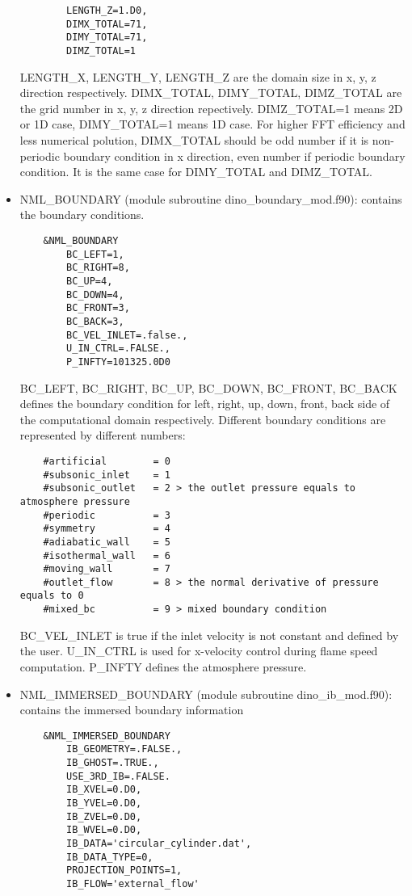\begin{itemize}
\begin{lstlisting}
        LENGTH_Z=1.D0,
        DIMX_TOTAL=71,
        DIMY_TOTAL=71,
        DIMZ_TOTAL=1
  \end{lstlisting}
  LENGTH\_X, LENGTH\_Y, LENGTH\_Z are the domain size in x, y, z direction respectively. DIMX\_TOTAL, DIMY\_TOTAL, DIMZ\_TOTAL are the grid number in x, y, z direction repectively. DIMZ\_TOTAL=1 means 2D or 1D case, DIMY\_TOTAL=1 means 1D case. For higher FFT efficiency and less numerical polution, DIMX\_TOTAL should be odd number if it is non-periodic boundary condition in x direction, even number if periodic boundary condition. It is the same case for DIMY\_TOTAL and DIMZ\_TOTAL.
  \item NML\_BOUNDARY (module subroutine dino\_boundary\_mod.f90): contains the boundary conditions.
  \begin{lstlisting}
    &NML_BOUNDARY
        BC_LEFT=1,
        BC_RIGHT=8,
        BC_UP=4,
        BC_DOWN=4,
        BC_FRONT=3,
        BC_BACK=3,
        BC_VEL_INLET=.false.,
        U_IN_CTRL=.FALSE.,
        P_INFTY=101325.0D0
  \end{lstlisting}
  BC\_LEFT, BC\_RIGHT, BC\_UP, BC\_DOWN, BC\_FRONT, BC\_BACK defines the boundary condition for left, right, up, down, front, back side of the computational domain respectively.
  Different boundary conditions are represented by different numbers:
  \begin{lstlisting}
    #artificial        = 0
    #subsonic_inlet    = 1
    #subsonic_outlet   = 2 > the outlet pressure equals to atmosphere pressure
    #periodic          = 3
    #symmetry          = 4
    #adiabatic_wall    = 5
    #isothermal_wall   = 6
    #moving_wall       = 7
    #outlet_flow       = 8 > the normal derivative of pressure equals to 0
    #mixed_bc          = 9 > mixed boundary condition
  \end{lstlisting}
  BC\_VEL\_INLET is true if the inlet velocity is not constant and defined by the user. U\_IN\_CTRL is used for x-velocity control during flame speed computation. P\_INFTY defines the atmosphere pressure.
  \item NML\_IMMERSED\_BOUNDARY (module subroutine dino\_ib\_mod.f90): contains the immersed boundary information
  \begin{lstlisting}
    &NML_IMMERSED_BOUNDARY
        IB_GEOMETRY=.FALSE.,
        IB_GHOST=.TRUE.,
        USE_3RD_IB=.FALSE.
        IB_XVEL=0.D0,
        IB_YVEL=0.D0,
        IB_ZVEL=0.D0,
        IB_WVEL=0.D0,
        IB_DATA='circular_cylinder.dat',
        IB_DATA_TYPE=0,
        PROJECTION_POINTS=1,
        IB_FLOW='external_flow'

\end{lstlisting}
\end{itemize}
